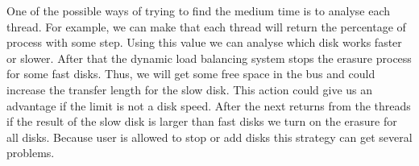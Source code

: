 One of the possible ways of trying to find the medium time is to analyse each thread. For example, we can make that each thread will return the percentage of process with some step. Using this value we can analyse which disk works faster or slower. After that the dynamic load balancing system stops the erasure process for some fast disks. Thus, we will get some free space in the bus and could increase the transfer length for the slow disk. This action could give us an advantage if the limit is not a disk speed. After the next returns from the threads if the result of the slow disk is larger than fast disks we turn on the erasure for all disks. Because user is allowed to stop or add disks this strategy can get several problems.

